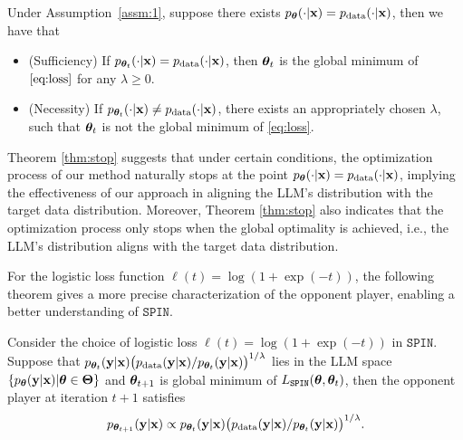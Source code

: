 \documentclass{article}
\newcommand{\method}{\texttt{SPIN}}
\begin{document}
\begin{theorem}\label{thm:stop}
Under Assumption~\ref{assm:1}, suppose there exists $p_{\bm{\theta}}(\cdot|\mathbf{x}) = p_{\mathrm{data}}(\cdot|\mathbf{x})$, then we have that  
\begin{itemize}[leftmargin=*,nosep]
\item (Sufficiency) If $p_{\bm{\theta}_t}(\cdot|\mathbf{x}) = p_{\mathrm{data}}(\cdot|\mathbf{x})$, then $\bm{\theta}_t$ is the global minimum of $\eqref{eq:loss}$ for any $\lambda\geq 0$. 
\item (Necessity) If $p_{\bm{\theta}_t}(\cdot|\mathbf{x})  \not= p_{\mathrm{data}}(\cdot|\mathbf{x})$, there exists an appropriately chosen $\lambda$, such that $\bm{\theta}_{t}$ is not the global minimum of \eqref{eq:loss}.
\end{itemize}
\end{theorem}


\begin{remark}Theorem \ref{thm:stop} suggests that under certain conditions, the optimization process of our method naturally stops at the point $p_{\bm{\theta}}(\cdot|\mathbf{x}) = p_{\mathrm{data}}(\cdot|\mathbf{x})$, implying the effectiveness of our approach in aligning the LLM's distribution with the target data distribution. Moreover, Theorem \ref{thm:stop} also indicates that the optimization process only stops when the global optimality is achieved, i.e., the LLM's distribution aligns with the target data distribution.
\end{remark}
For the logistic loss function $\ell(t) = \log(1+\exp(-t))$, the following theorem gives a more precise characterization of the opponent player, enabling a better understanding of $\method$.
\begin{theorem}\label{thm:main2} Consider the choice of logistic loss $\ell(t) = \log(1+\exp(-t))$ in $\method$. Suppose that $p_{\bm{\theta}_{t}}(\mathbf{y}|\mathbf{x})\big(p_{\mathrm{data}}(\mathbf{y}|\mathbf{x})/p_{\bm{\theta}_{t}}(\mathbf{y}|\mathbf{x}) \big)^{1/\lambda}$ lies in the LLM space $\{p_{\bm{\theta}}(\mathbf{y}|\mathbf{x})|\bm{\theta} \in \bm{\Theta}\}$ and $\bm{\theta}_{t+1}$ is global minimum of $L_{\method}(\btheta, \btheta_t)$, then the opponent player at iteration $t+1$ satisfies
\begin{align*}
p_{\bm{\theta}_{t+1}}(\mathbf{y}|\mathbf{x}) \propto p_{\bm{\theta}_{t}}(\mathbf{y}|\mathbf{x})\big(p_{\mathrm{data}}(\mathbf{y}|\mathbf{x})/p_{\bm{\theta}_{t}}(\mathbf{y}|\mathbf{x}) \big)^{1/\lambda}.  
\end{align*}
\end{theorem}
\end{document}
